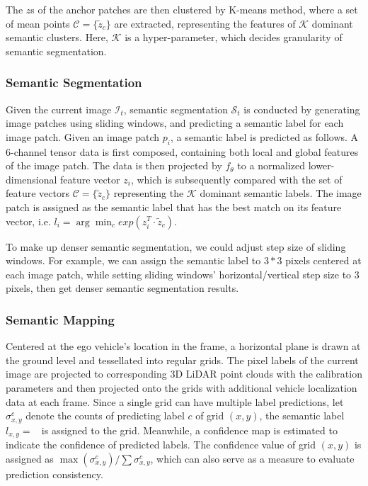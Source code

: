 \documentclass[letterpaper, 10 pt, conference]{ieeeconf}  %
\begin{document}
The $z$s of the anchor patches are then clustered by K-means method, where a set of mean points $\mathcal{C}=\{\tilde{z}_c\}$ are extracted, representing the features of $\mathcal{K}$ dominant semantic clusters. Here, $\mathcal{K}$ is a hyper-parameter, which decides granularity of semantic segmentation.

\subsubsection{Semantic Segmentation}

Given the current image $\mathcal{I}_t$, semantic segmentation $\mathcal{S}_t$ is conducted by generating image patches using sliding windows, and predicting a semantic label for each image patch.
Given an image patch $p_i$, a semantic label is predicted as follows. A 6-channel tensor data is first composed, containing both local and global features of the image patch. The data is then projected by $f_{\theta}$ to a normalized lower-dimensional feature vector $z_i$, which is subsequently compared with the set of feature vectors $\mathcal{C}=\{\tilde{z}_c\}$ representing the $\mathcal{K}$ dominant semantic labels. The image patch is assigned as the semantic label that has the best match on its feature vector, i.e. $l_i = \arg\min_c exp(z_i^T \cdot \tilde{z}_c)$.

To make up denser semantic segmentation, we could adjust step size of sliding windows. For example, we can assign the semantic label to $3*3$ pixels centered at each image patch, while setting sliding windows' horizontal/vertical step size to 3 pixels, then get denser semantic segmentation results.

\subsubsection{Semantic Mapping} \label{3_SM}

Centered at the ego vehicle's location in the frame, a horizontal plane is drawn at the ground level and tessellated into regular grids. The pixel labels of the current image are projected to corresponding 3D LiDAR point clouds with the calibration parameters and then projected onto the grids with additional vehicle localization data at each frame. Since a single grid can have multiple label predictions, let $\sigma_{x,y}^c$ denote the counts of predicting label $c$ of grid $(x,y)$, the semantic label $l_{x,y}=\mathop{\text{argmax}_{c} (\sigma_{x,y}^c)}$ is assigned to the grid. Meanwhile, a confidence map is estimated to indicate the confidence of predicted labels. The confidence value of grid $(x,y)$ is assigned as $\max(\sigma_{x,y}^c)/\sum{\sigma_{x,y}^c}$, which can also serve as a measure to evaluate prediction consistency.
\end{document}
